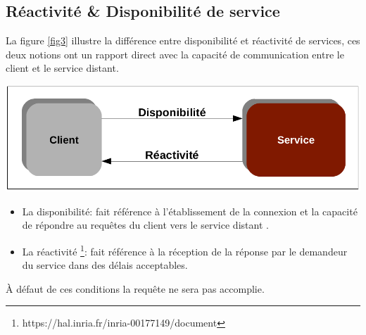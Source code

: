 \documentclass[12pt, a4paper, openany]{report}
\begin{document}
  \subsection{Réactivité \& Disponibilité de service}
   
   La figure \ref{fig3} illustre la différence entre disponibilité et réactivité de services, ces deux notions ont un rapport direct avec la capacité de communication entre le client et le service distant.
   
   \begin{center}
     \includegraphics[scale=0.4]{reactivite_disponibilite_service_3.png}
     \label{fig3}
   \end{center}
   
   \begin{itemize}
      \item La disponibilité: fait référence à l’établissement de la connexion et la capacité de répondre au requêtes du client vers le service distant \cite{refbibDispo}.
      \item La réactivité \footnote{https://hal.inria.fr/inria-00177149/document}: fait référence à la réception de la réponse par le demandeur du service dans des délais acceptables. 
  \end{itemize}
  
  À défaut de ces conditions la requête ne sera pas accomplie.
  
\end{document}

